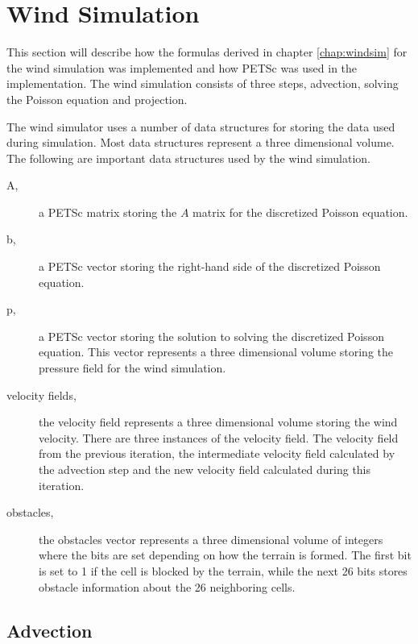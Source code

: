 \section{Wind Simulation}

This section will describe how the formulas derived in chapter \ref{chap:windsim}
for the wind simulation was implemented and how PETSc was used in the
implementation. The wind simulation consists of three steps, advection, solving
the Poisson equation and projection. 

The wind simulator uses a number of data structures for storing the data used
during simulation. Most data structures represent a three dimensional volume.
The following are important data structures used by the wind simulation.
\begin{description}
	\item[A,] a PETSc matrix storing the $A$ matrix for the discretized Poisson
		equation.
	\item[b,] a PETSc vector storing the right-hand side of the discretized
		Poisson equation.
	\item[p,] a PETSc vector storing the solution to solving the discretized
		Poisson equation. This vector represents a three dimensional volume
		storing the pressure field for the wind simulation.
	\item[velocity fields,] the velocity field represents a three dimensional
		volume storing the wind velocity. There are three instances of the velocity
		field. The velocity field from the previous iteration, the intermediate
		velocity field calculated by the advection step and the new velocity
		field calculated during this iteration.
	\item[obstacles,] the obstacles vector represents a three dimensional volume
		of integers where the bits are set depending on how the terrain is
		formed. The first bit is set to 1 if the cell is blocked by the terrain,
		while the next 26 bits stores obstacle information about the 26
		neighboring cells.
\end{description}

\subsection{Advection}

